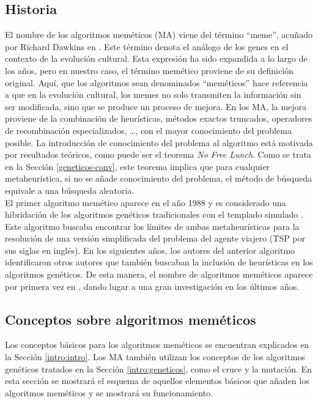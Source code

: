 \subsection{Historia}
El nombre de los algoritmos meméticos (MA) viene del término ``meme'', acuñado por Richard Dawkins en \cite{dawkins-1989}. Este término denota el análogo de los genes en el contexto de la evolución cultural. Esta expresión ha sido expandida a lo largo de los años, pero en nuestro caso, el término memético proviene de su definición original. Aquí, que los algoritmos sean denominados ``meméticos'' hace referencia a que en la evolución cultural, los memes no solo transmiten la información sin ser modificada, sino que se produce un proceso de mejora. En los MA, la mejora proviene de la combinación de heurísticas, métodos exactos truncados, operadores de recombinación especializados, \ldots, con el mayor conocimiento del problema posible. La introducción de conocimiento del problema al algoritmo está motivada por resultados teóricos, como puede ser el teorema \textit{No Free Lunch}. Como se trata en la Sección \ref{geneticos-conv}, este teorema implica que para cualquier metaheurística, si no se añade conocimiento del problema, el método de búsqueda equivale a una búsqueda aleatoria.\\

El primer algoritmo memético aparece en el año 1988 y es considerado una hibridación de los algoritmos genéticos tradicionales con el templado simulado \cite{firstma}. Este algoritmo buscaba encontrar los límites de ambas metaheurísticas para la resolución de una versión simplificada del problema del agente viajero (TSP por sus siglas en inglés). En los siguientes años, los autores del anterior algoritmo identificaron otros autores que también buscaban la inclusión de heurísticas en los algoritmos genéticos. De esta manera, el nombre de algoritmos meméticos aparece por primera vez en \cite{memetic-name}, dando lugar a una gran investigación en los últimos años. 
\subsection{Conceptos sobre algoritmos meméticos}
Los conceptos básicos para los algoritmos meméticos se encuentran explicados en la Sección \ref{intro:intro}. Los MA también utilizan los conceptos de los algoritmos genéticos tratados en la Sección \ref{intro:geneticos}, como el cruce y la mutación. En esta sección se mostrará el esquema de aquellos elementos básicos que añaden los algoritmos meméticos y se mostrará su funcionamiento.\\

